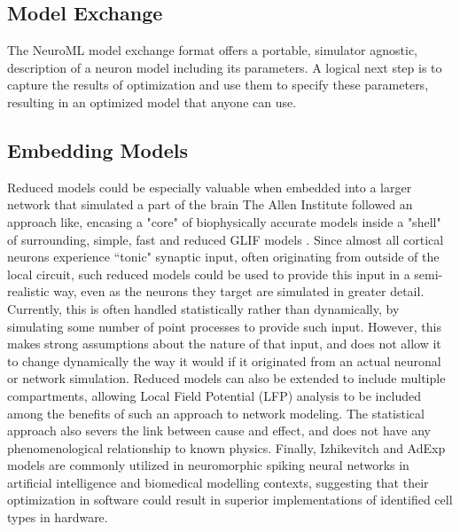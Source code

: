 \subsection{Model Exchange}
The NeuroML model exchange format \citep{gleeson2010neuroml} offers a portable, simulator agnostic, description of a neuron model including its parameters.
A logical next step is to capture the results of optimization and use them to specify these parameters, resulting in an optimized model that anyone can use.

\subsection{Embedding Models}
Reduced models could be especially valuable when embedded into a larger network that simulated a part of the brain
The Allen Institute followed an approach like, encasing a "core" of biophysically accurate models inside a "shell" of surrounding, simple, fast and reduced GLIF models \citep{billeh2020systematic}.
Since almost all cortical neurons experience ``tonic" synaptic input, often originating from outside of the local circuit, such reduced models could be used to provide this input in a semi-realistic way, even as the neurons they target are simulated in greater detail.
Currently, this is often handled statistically rather than dynamically, by simulating some number of point processes to provide such input.
However, this makes strong assumptions about the nature of that input, and does not allow it to change dynamically the way it would if it originated from an actual neuronal or network simulation.
Reduced models can also be extended to include multiple compartments, allowing Local Field Potential (LFP) analysis to be included among the benefits of such an approach to network modeling.
The statistical approach also severs the link between cause and effect, and does not have any phenomenological relationship to known physics.
Finally, Izhikevitch and AdExp models are commonly utilized in neuromorphic spiking neural networks in artificial intelligence and biomedical modelling contexts, suggesting that their optimization in software could result in superior implementations of identified cell types in hardware.


